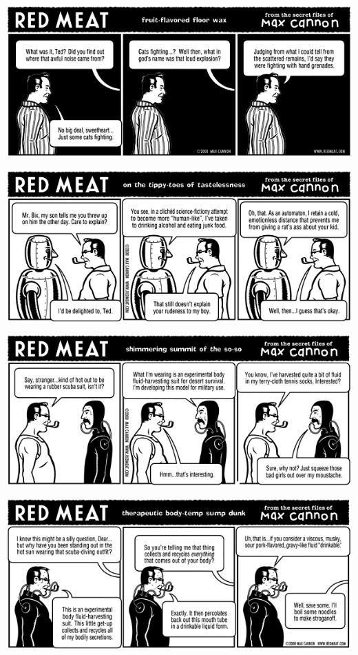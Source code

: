 \documentclass[a4paper,twoside,11pt]{article}
\begin{document}
\includegraphics[width=\textwidth]{redmeat_2000-06-06.png}



\includegraphics[width=\textwidth]{redmeat_2000-06-13.png}



\includegraphics[width=\textwidth]{redmeat_2000-06-20.png}



\includegraphics[width=\textwidth]{redmeat_2000-06-27.png}
\end{document}
